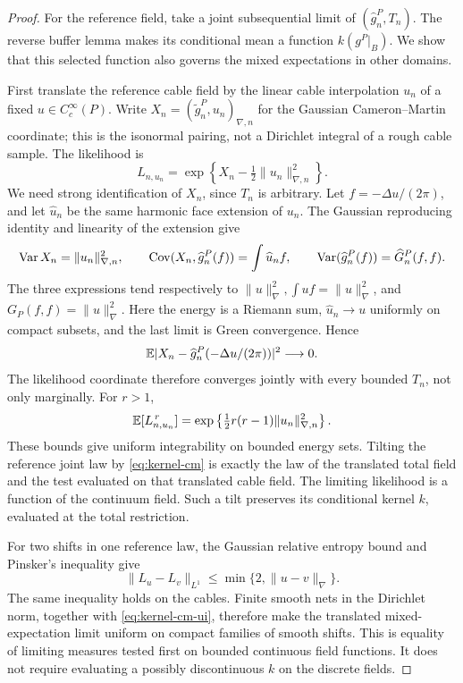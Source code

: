 \begin{proof}
For the reference field, take a joint subsequential limit of
\((\widehat g_n^P,T_n)\). The reverse buffer lemma makes its conditional
mean a function \(k(g^P|_B)\). We show that this selected function also
governs the mixed expectations in other domains.

First translate the reference cable field by the linear cable
interpolation \(u_n\) of a fixed \(u\in C_c^\infty(P)\). Write
\(X_n=(\widetilde g_n^P,u_n)_{\nabla,n}\) for the Gaussian
Cameron--Martin coordinate; this is the isonormal pairing, not a
Dirichlet integral of a rough cable sample. The likelihood is
\begin{equation}
 L_{n,u_n}
 =\exp\left\{X_n-\tfrac12\|u_n\|_{\nabla,n}^2\right\}.
 \label{eq:kernel-cm}
\end{equation}
We need strong identification of \(X_n\), since \(T_n\) is arbitrary.
Let \(f=-\Delta u/(2\pi)\), and let \(\widehat u_n\) be the same
harmonic face extension of \(u_n\). The Gaussian reproducing identity
and linearity of the extension give
\[
 \operatorname{Var} X_n=\|u_n\|_{\nabla,n}^2,\qquad
 \operatorname{Cov}(X_n,\widehat g_n^P(f))=\int \widehat u_n f,\qquad
 \operatorname{Var}(\widehat g_n^P(f))=\widehat G_n^P(f,f).
\]
The three expressions tend respectively to
\(\|u\|_\nabla^2,\int uf=\|u\|_\nabla^2\), and
\(G_P(f,f)=\|u\|_\nabla^2\). Here the energy is a Riemann sum,
\(\widehat u_n\to u\) uniformly on compact subsets, and the last
limit is Green convergence. Hence
\begin{equation}
       \mathbb E|X_n-\widehat g_n^P(-\Delta u/(2\pi))|^2\longrightarrow0.
 \label{eq:kernel-cm-coordinate}
\end{equation}
The likelihood coordinate therefore converges jointly with every
bounded \(T_n\), not only marginally. For \(r>1\),
\begin{equation}
 \mathbb E[L_{n,u_n}^{\,r}]
   =\exp\left\{\tfrac12r(r-1)\|u_n\|_{\nabla,n}^2\right\}.
 \label{eq:kernel-cm-ui}
\end{equation}
These bounds give uniform integrability on bounded energy sets.
Tilting the reference joint law by \eqref{eq:kernel-cm} is exactly
the law of the translated total field and the test evaluated on that
translated cable field. The limiting likelihood is a function of the
continuum field. Such a tilt preserves its conditional kernel \(k\),
evaluated at the total restriction.

For two shifts in one reference law, the Gaussian relative entropy
bound and Pinsker's inequality give
\begin{equation}
       \|L_u-L_v\|_{L^1}
       \le \min\{2,\|u-v\|_\nabla\}.
 \label{eq:kernel-cm-continuity}
\end{equation}
The same inequality holds on the cables. Finite smooth nets in the
Dirichlet norm, together with \eqref{eq:kernel-cm-ui}, therefore make
the translated mixed-expectation limit uniform on compact families of
smooth shifts. This is equality of limiting measures tested first on
bounded continuous field functions. It does not require evaluating
a possibly discontinuous \(k\) on the discrete fields.


\end{proof}
